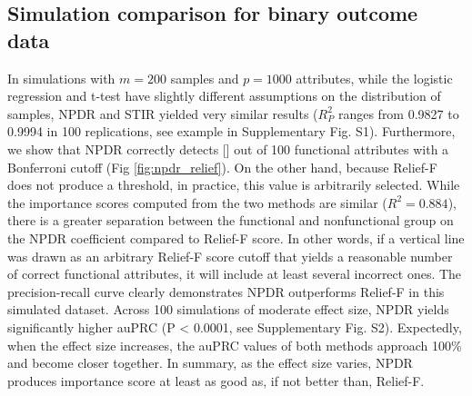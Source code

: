 \documentclass[10pt]{article}
\begin{document}
\subsection{Simulation comparison for binary outcome data} 
In simulations with $m = 200$ samples and $p = 1000$ attributes, while the logistic regression and t-test have slightly different assumptions on the distribution of samples, NPDR and STIR yielded very similar results ($R_P^2$ ranges from 0.9827 to 0.9994 in 100 replications, see example in Supplementary Fig. S1).
Furthermore, we show that NPDR correctly detects [] out of 100 functional attributes with a Bonferroni cutoff (Fig \ref{fig:npdr_relief}).
On the other hand, because Relief-F does not produce a threshold, in practice, this value is arbitrarily selected.
While the importance scores computed from the two methods are similar ($R^2 = 0.884$), there is a greater separation between the functional and nonfunctional group on the NPDR coefficient compared to Relief-F score.
In other words, if a vertical line was drawn as an arbitrary Relief-F score cutoff that yields a reasonable number of correct functional attributes, it will include at least several incorrect ones. 
The precision-recall curve clearly demonstrates NPDR outperforms Relief-F in this simulated dataset.
Across 100 simulations of moderate effect size, NPDR yields significantly higher auPRC (P < 0.0001, see Supplementary Fig. S2).
Expectedly, when the effect size increases, the auPRC values of both methods approach 100\% and become closer together.
In summary, as the effect size varies, NPDR produces importance score at least as good as, if not better than, Relief-F.
\end{document}

